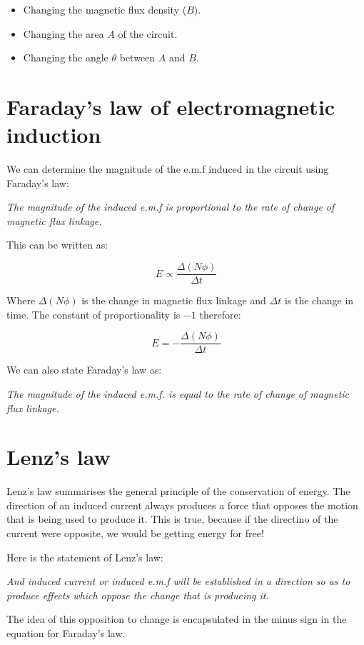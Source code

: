 \documentclass{article}
\begin{document}
\begin{itemize}

	\item Changing the magnetic flux density ($B$).

	\item Changing the area $A$ of the circuit.

	\item Changing the angle $\theta$ between $A$ and $B$.

\end{itemize}

\section*{Faraday's law of electromagnetic induction}

We can determine the magnitude of the e.m.f induced in the circuit using
Faraday's law:

{\it The magnitude of the induced e.m.f is proportional to the rate of change of
magnetic flux linkage.}

This can be written as:

\[
	E \propto \frac{\Delta(N\phi)}{\Delta t}
\]

Where $\Delta(N\phi)$ is the change in magnetic flux linkage and $\Delta t$ is
the change in time. The constant of proportionality is $-1$ therefore:

\[
	E = -\frac{\Delta(N\phi)}{\Delta t}
\]

We can also state Faraday's law as:

{\it The magnitude of the induced e.m.f. is equal to the rate of change of
magnetic flux linkage.}

\section*{Lenz's law}

Lenz's law summarises the general principle of the conservation of energy. The
direction of an induced current always produces a force that opposes the motion
that is being used to produce it. This is true, because if the directino of the
current were opposite, we would be getting energy for free!

Here is the statement of Lenz's law:

{\it And induced current or induced e.m.f will be established in a direction so
as to produce effects which oppose the change that is producing it.}

The idea of this opposition to change is encapsulated in the minus sign in the
equation for Faraday's law.
\end{document}
